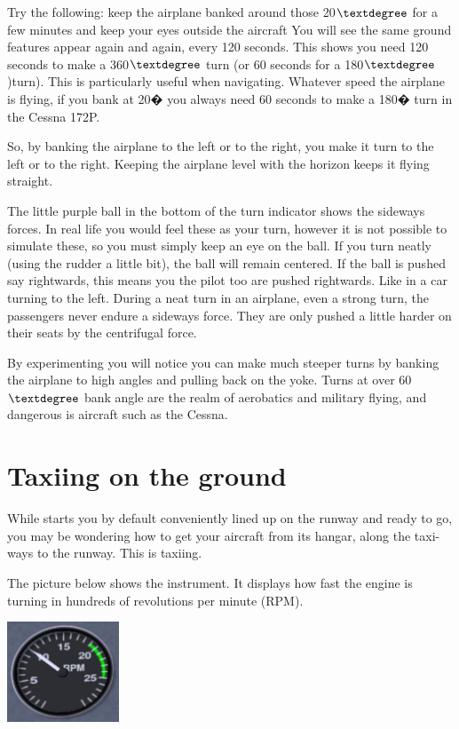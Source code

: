 Try the following: keep the airplane banked around those 20$\textdegree$ for a 
few minutes and keep your eyes outside the aircraft You will see the same 
ground features appear again and again, every 120 seconds. This shows you 
need 120 seconds to make a 360$\textdegree$ turn (or 60 seconds for a 
180$\textdegree$)turn). This is particularly useful when navigating.
Whatever speed the airplane is flying, if you bank at 20� you always need 60 
seconds to make a 180� turn in the Cessna 172P.
      
So, by banking the airplane to the left or to the right, you make it turn to 
the left or to the right. Keeping the airplane level with the horizon keeps 
it flying straight.

The little purple ball in the bottom of the turn indicator 
shows the sideways forces. In real life you would feel these as your turn, 
however it is not possible to simulate these, so you must simply keep an eye
on the ball. If you turn neatly (using the rudder a little bit), 
the ball will remain centered. If the ball is pushed say rightwards, this 
means you the pilot too are pushed rightwards. Like in a car turning to the 
left. During a neat turn in an airplane, even a strong turn, the passengers 
never endure a sideways force. They are only pushed a little harder on their 
seats by the centrifugal force.

By experimenting you will notice you can make much steeper turns by
banking the airplane to high angles and pulling back on the yoke. Turns at over
60$\textdegree$ bank angle are the realm of aerobatics and military flying, and
dangerous is aircraft such as the Cessna. 
      
\section{Taxiing on the ground}
\label{sec:TaxiTurning}

While \FlightGear{} starts you by default conveniently lined up on the
runway and ready to go, you may be wondering how to get your aircraft from
its hangar, along the taxi-ways to the runway. This is taxiing.
    
The picture below shows the  instrument. It displays how fast 
the engine is turning in hundreds of revolutions per minute (RPM).

\begin{center}
\includegraphics[width=0.25\textwidth]{img/tut_20}
\end{center}

